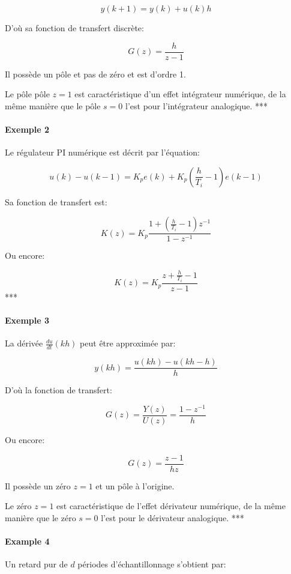 \documentclass[11pt]{article}
\begin{document}
\[ y(k+1) = y(k) + u(k)h \]

D'où sa fonction de transfert discrète:

\[ G(z) = \frac{h}{z-1} \]

Il possède un pôle et pas de zéro et est d'ordre 1.

Le pôle pôle \(z=1\) est caractéristique d'un effet intégrateur
numérique, de la même manière que le pôle \(s=0\) l'est pour
l'intégrateur analogique. ***

    \paragraph{Exemple 2}\label{exemple-2}

Le régulateur PI numérique est décrit par l'équation:

\[ u(k) - u(k-1) = K_p e(k) + K_p \left( \frac{h}{T_i} - 1 \right) e(k-1) \]

Sa fonction de transfert est:

\[ K(z) = K_p \frac{1 + \left( \frac{h}{T_i} - 1 \right) z^{-1}}{1 - z^{-1}} \]

Ou encore:

\[ K(z) = K_p \frac{z + \frac{h}{T_i} - 1}{z - 1} \] ***

    \paragraph{Exemple 3}\label{exemple-3}

La dérivée \(\frac{du}{dt}(kh)\) peut être approximée par:

\[ y(kh) = \frac{u(kh) - u(kh-h)}{h} \]

D'où la fonction de transfert:

\[ G(z) =  \frac{Y(z)}{U(z)} = \frac{1-z^{-1}}{h} \]

Ou encore:

\[ G(z) = \frac{z-1}{hz} \]

Il possède un zéro \(z=1\) et un pôle à l'origine.

Le zéro \(z=1\) est caractéristique de l'effet dérivateur numérique, de
la même manière que le zéro \(s=0\) l'est pour le dérivateur analogique.
***

    \paragraph{Example 4}\label{example-4}

Un retard pur de \(d\) périodes d'échantillonnage s'obtient par:
\end{document}
